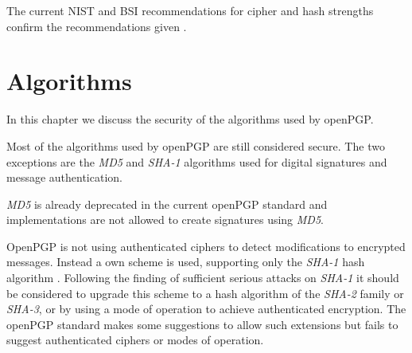 The current NIST and BSI recommendations for cipher and hash strengths confirm the recommendations given \cite{keylenNIST} \cite{KeylenBSI}. 

\section{Algorithms}

In this chapter we discuss the security of the algorithms used by openPGP.




Most of the algorithms used by openPGP are still considered secure. 
The two exceptions are the \textit{MD5} and \textit{SHA-1} algorithms used for digital signatures and message authentication. 

\textit{MD5} is already deprecated in the current openPGP standard \citep[section 14]{RFC4880} and implementations are not allowed to create signatures using \textit{MD5}. 

OpenPGP is not using authenticated ciphers to detect modifications to encrypted messages.
Instead a own scheme is used, supporting only the \textit{SHA-1} hash algorithm \citep[section 5.13]{RFC4880}. 
Following the finding of sufficient serious attacks on \textit{SHA-1} \cite{SHA1attack} it should be considered to upgrade this scheme to a hash algorithm of the \textit{SHA-2} family or \textit{SHA-3}, or by using a mode of operation to achieve authenticated encryption. The openPGP standard makes some suggestions to allow such extensions \citep[section 13.11]{RFC4880} but fails to suggest authenticated ciphers or modes of operation.





